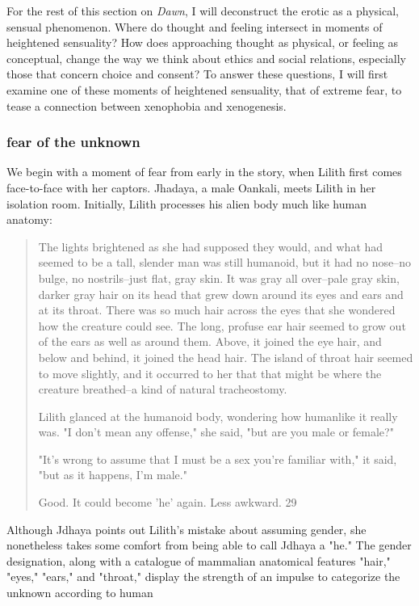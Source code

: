 \documentclass[11pt]{article}
\begin{document}
For the rest of this section on \emph{Dawn}, I will deconstruct the erotic
as a physical, sensual phenomenon. Where do thought and feeling
intersect in moments of heightened sensuality? How does approaching
thought as physical, or feeling as conceptual, change the way we think
about ethics and social relations, especially those that concern
choice and consent? To answer these questions, I will first examine
one of these moments of heightened sensuality, that of extreme fear,
to tease a connection between xenophobia and xenogenesis.

\subsubsection{fear of the unknown}
\label{sec:orgf45cbbb}
We begin with a moment of fear from early in the story, when Lilith
first comes face-to-face with her captors. Jhadaya, a male Oankali,
meets Lilith in her isolation room. Initially, Lilith processes his
alien body much like human anatomy:
\begin{quote}
The lights brightened as she had supposed they would, and what had
seemed to be a tall, slender man was still humanoid, but it had no
nose--no bulge, no nostrils--just flat, gray skin. It was gray all
over--pale gray skin, darker gray hair on its head that grew down
around its eyes and ears and at its throat. There was so much hair
across the eyes that she wondered how the creature could see. The
long, profuse ear hair seemed to grow out of the ears as well as
around them. Above, it joined the eye hair, and below and behind, it
joined the head hair. The island of throat hair seemed to move
slightly, and it occurred to her that that might be where the creature
breathed--a kind of natural tracheostomy.

Lilith glanced at the humanoid body, wondering how humanlike it really
was. "I don't mean any offense," she said, "but are you male or
female?"

"It's wrong to assume that I must be a sex you're familiar with," it
said, "but as it happens, I'm male."

Good. It could become 'he' again. Less awkward. 29
\end{quote}
Although Jdhaya points out Lilith's mistake about assuming gender, she
nonetheless takes some comfort from being able to call Jdhaya a "he."
The gender designation, along with a catalogue of mammalian anatomical
features "hair," "eyes," "ears," and "throat," display the strength of
an impulse to categorize the unknown according to human
\end{document}
